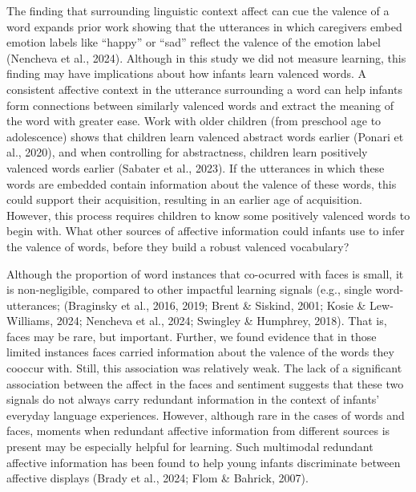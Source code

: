\documentclass[10pt, letterpaper]{article}
\begin{document}
The finding that surrounding linguistic context affect can cue the
valence of a word expands prior work showing that the utterances in
which caregivers embed emotion labels like ``happy'' or ``sad'' reflect
the valence of the emotion label (Nencheva et al., 2024). Although in
this study we did not measure learning, this finding may have
implications about how infants learn valenced words. A consistent
affective context in the utterance surrounding a word can help infants
form connections between similarly valenced words and extract the
meaning of the word with greater ease. Work with older children (from
preschool age to adolescence) shows that children learn valenced
abstract words earlier (Ponari et al., 2020), and when controlling for
abstractness, children learn positively valenced words earlier (Sabater
et al., 2023). If the utterances in which these words are embedded
contain information about the valence of these words, this could support
their acquisition, resulting in an earlier age of acquisition. However,
this process requires children to know some positively valenced words to
begin with. What other sources of affective information could infants
use to infer the valence of words, before they build a robust valenced
vocabulary?

Although the proportion of word instances that co-ocurred with faces is
small, it is non-negligible, compared to other impactful learning
signals (e.g., single word-utterances; (Braginsky et al., 2016, 2019;
Brent \& Siskind, 2001; Kosie \& Lew-Williams, 2024; Nencheva et al.,
2024; Swingley \& Humphrey, 2018). That is, faces may be rare, but
important. Further, we found evidence that in those limited instances
faces carried information about the valence of the words they cooccur
with. Still, this association was relatively weak. The lack of a
significant association between the affect in the faces and sentiment
suggests that these two signals do not always carry redundant
information in the context of infants' everyday language experiences.
However, although rare in the cases of words and faces, moments when
redundant affective information from different sources is present may be
especially helpful for learning. Such multimodal redundant affective
information has been found to help young infants discriminate between
affective displays (Brady et al., 2024; Flom \& Bahrick, 2007).
\end{document}

